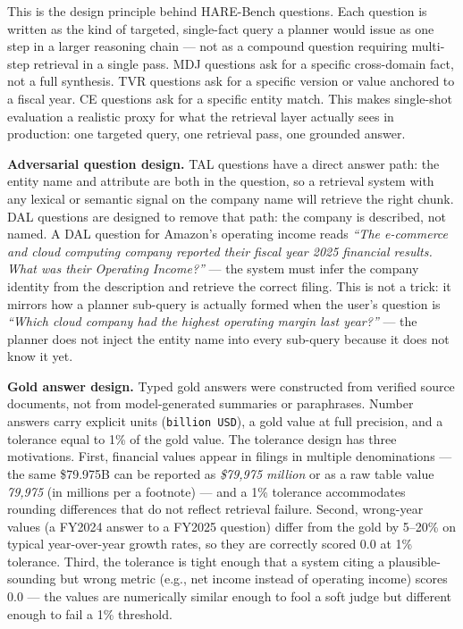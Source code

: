 \documentclass[
]{article}
\begin{document}
This is the design principle behind HARE-Bench questions. Each question
is written as the kind of targeted, single-fact query a planner would
issue as one step in a larger reasoning chain --- not as a compound
question requiring multi-step retrieval in a single pass. MDJ questions
ask for a specific cross-domain fact, not a full synthesis. TVR
questions ask for a specific version or value anchored to a fiscal year.
CE questions ask for a specific entity match. This makes single-shot
evaluation a realistic proxy for what the retrieval layer actually sees
in production: one targeted query, one retrieval pass, one grounded
answer.

\textbf{Adversarial question design.} TAL questions have a direct answer
path: the entity name and attribute are both in the question, so a
retrieval system with any lexical or semantic signal on the company name
will retrieve the right chunk. DAL questions are designed to remove that
path: the company is described, not named. A DAL question for Amazon's
operating income reads \emph{``The e-commerce and cloud computing
company reported their fiscal year 2025 financial results. What was
their Operating Income?''} --- the system must infer the company
identity from the description and retrieve the correct filing. This is
not a trick: it mirrors how a planner sub-query is actually formed when
the user's question is \emph{``Which cloud company had the highest
operating margin last year?''} --- the planner does not inject the
entity name into every sub-query because it does not know it yet.

\textbf{Gold answer design.} Typed gold answers were constructed from
verified source documents, not from model-generated summaries or
paraphrases. Number answers carry explicit units
(\texttt{billion\ USD}), a gold value at full precision, and a tolerance
equal to 1\% of the gold value. The tolerance design has three
motivations. First, financial values appear in filings in multiple
denominations --- the same \$79.975B can be reported as \emph{\$79,975
million} or as a raw table value \emph{79,975} (in millions per a
footnote) --- and a 1\% tolerance accommodates rounding differences that
do not reflect retrieval failure. Second, wrong-year values (a FY2024
answer to a FY2025 question) differ from the gold by 5--20\% on typical
year-over-year growth rates, so they are correctly scored 0.0 at 1\%
tolerance. Third, the tolerance is tight enough that a system citing a
plausible-sounding but wrong metric (e.g., net income instead of
operating income) scores 0.0 --- the values are numerically similar
enough to fool a soft judge but different enough to fail a 1\%
threshold.
\end{document}
